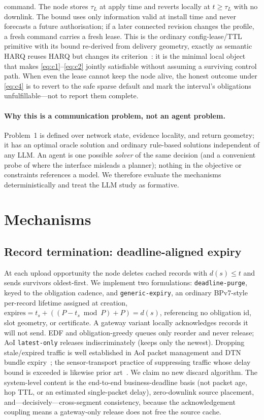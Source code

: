 \documentclass[11pt]{article}
\begin{document}
command. The node stores $\tau_L$ at apply time and reverts locally at $t\geq\tau_L$ with no
downlink. The bound uses only information valid at install time and never forecasts a future
authorisation; if a later connected revision changes the profile, a fresh command carries a fresh
lease. This is the ordinary config-lease/TTL primitive with its bound re-derived from delivery
geometry, exactly as semantic HARQ reuses HARQ but changes its criterion~\cite{razavivideo}: it is
the minimal local object that makes \eqref{eq:c1}--\eqref{eq:c2} jointly satisfiable without
assuming a surviving control path. When even the lease cannot keep the node alive, the honest
outcome under \eqref{eq:c4} is to revert to the safe sparse default and mark the interval's
obligations unfulfillable---not to report them complete.

\paragraph{Why this is a communication problem, not an agent problem.}
Problem~1 is defined over network state, evidence locality, and return geometry; it has an optimal
oracle solution and ordinary rule-based solutions independent of any LLM. An agent is one possible
\emph{solver} of the same decision (and a convenient probe of where the interface misleads a
planner); nothing in the objective or constraints references a model. We therefore evaluate the
mechanisms deterministically and treat the LLM study as formative.

\section{Mechanisms}
\label{sec:mech}

\subsection{Record termination: deadline-aligned expiry}
\label{sec:mech-record}
At each upload opportunity the node deletes cached records with $d(s)\le t$ and sends survivors
oldest-first. We implement two formulations: \texttt{deadline-purge}, keyed to the obligation
cadence, and \texttt{generic-expiry}, an ordinary BPv7-style per-record lifetime assigned at
creation, $\text{expires}=t_s+((P-t_s\bmod P)+P)=d(s)$, referencing no obligation id, slot
geometry, or certificate. A gateway variant locally acknowledges records it will not send. EDF and
obligation-greedy queues only reorder and never release; AoI \texttt{latest-only} releases
indiscriminately (keeps only the newest). Dropping stale/expired traffic is well established in AoI
packet management and DTN bundle expiry~\cite{costa2014pm,kam2016deadline,dtnarch,rfc9171}; the
sensor-transport practice of suppressing traffic whose delay bound is exceeded is likewise
prior art~\cite{wada2009timeout}. We claim no new discard algorithm. The system-level content is
the end-to-end business-deadline basis (not packet age, hop TTL, or an estimated single-packet
delay), zero-downlink source placement, and---decisively---cross-segment consistency, because the
acknowledgement coupling means a gateway-only release does not free the source cache.
\end{document}
